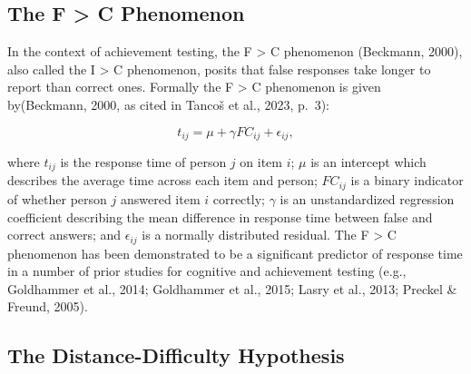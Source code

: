 \documentclass[
  number]{elsarticle}
\begin{document}
\subsection{The F \textgreater{} C Phenomenon}\label{the-f-c-phenomenon}

In the context of achievement testing, the F \textgreater{} C phenomenon
(Beckmann, 2000), also called the I \textgreater{} C phenomenon, posits
that false responses take longer to report than correct ones. Formally
the F \textgreater{} C phenomenon is given by(Beckmann, 2000, as cited
in Tancoš et al., 2023, p.~3):

\[
t_{ij} = \mu + \gamma FC_{ij}+\epsilon_{ij},
\]

where \(t_{ij}\) is the response time of person \(j\) on item \(i\);
\(\mu\) is an intercept which describes the average time across each
item and person; \(FC_{ij}\) is a binary indicator of whether person
\(j\) answered item \(i\) correctly; \(\gamma\) is an unstandardized
regression coefficient describing the mean difference in response time
between false and correct answers; and \(\epsilon_{ij}\) is a normally
distributed residual. The F \textgreater{} C phenomenon has been
demonstrated to be a significant predictor of response time in a number
of prior studies for cognitive and achievement testing (e.g., Goldhammer
et al., 2014; Goldhammer et al., 2015; Lasry et al., 2013; Preckel \&
Freund, 2005).

\subsection{The Distance-Difficulty
Hypothesis}\label{the-distance-difficulty-hypothesis}
\end{document}
